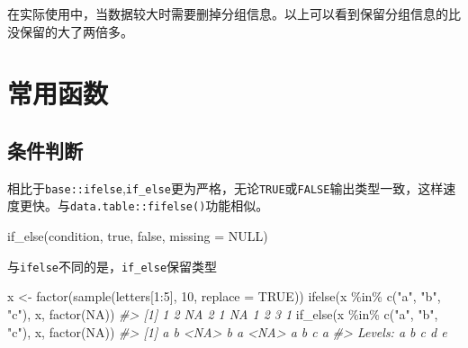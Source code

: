\documentclass[
]{book}
\newenvironment{Shaded}{\begin{snugshade}}{\end{snugshade}}
\newcommand{\AttributeTok}[1]{\textcolor[rgb]{0.77,0.63,0.00}{#1}}
\newcommand{\CommentTok}[1]{\textcolor[rgb]{0.56,0.35,0.01}{\textit{#1}}}
\newcommand{\ConstantTok}[1]{\textcolor[rgb]{0.00,0.00,0.00}{#1}}
\newcommand{\DecValTok}[1]{\textcolor[rgb]{0.00,0.00,0.81}{#1}}
\newcommand{\FunctionTok}[1]{\textcolor[rgb]{0.00,0.00,0.00}{#1}}
\newcommand{\NormalTok}[1]{#1}
\newcommand{\OtherTok}[1]{\textcolor[rgb]{0.56,0.35,0.01}{#1}}
\newcommand{\SpecialCharTok}[1]{\textcolor[rgb]{0.00,0.00,0.00}{#1}}
\newcommand{\StringTok}[1]{\textcolor[rgb]{0.31,0.60,0.02}{#1}}
\begin{document}
在实际使用中，当数据较大时需要删掉分组信息。以上可以看到保留分组信息的比没保留的大了两倍多。

\hypertarget{dplyr-functions}{%
\section{常用函数}\label{dplyr-functions}}

\hypertarget{ux6761ux4ef6ux5224ux65ad}{%
\subsection{条件判断}\label{ux6761ux4ef6ux5224ux65ad}}

相比于\texttt{base::ifelse},\texttt{if\_else}更为严格，无论\texttt{TRUE}或\texttt{FALSE}输出类型一致，这样速度更快。与\texttt{data.table::fifelse()}功能相似。

\begin{Shaded}
\begin{Highlighting}[]
\FunctionTok{if\_else}\NormalTok{(condition, true, false, }\AttributeTok{missing =} \ConstantTok{NULL}\NormalTok{)}
\end{Highlighting}
\end{Shaded}

与\texttt{ifelse}不同的是，\texttt{if\_else}保留类型

\begin{Shaded}
\begin{Highlighting}[]
\NormalTok{x }\OtherTok{\textless{}{-}} \FunctionTok{factor}\NormalTok{(}\FunctionTok{sample}\NormalTok{(letters[}\DecValTok{1}\SpecialCharTok{:}\DecValTok{5}\NormalTok{], }\DecValTok{10}\NormalTok{, }\AttributeTok{replace =} \ConstantTok{TRUE}\NormalTok{))}
\FunctionTok{ifelse}\NormalTok{(x }\SpecialCharTok{\%in\%} \FunctionTok{c}\NormalTok{(}\StringTok{"a"}\NormalTok{, }\StringTok{"b"}\NormalTok{, }\StringTok{"c"}\NormalTok{), x, }\FunctionTok{factor}\NormalTok{(}\ConstantTok{NA}\NormalTok{))}
\CommentTok{\#\textgreater{}  [1]  1  2 NA  2  1 NA  1  2  3  1}
\FunctionTok{if\_else}\NormalTok{(x }\SpecialCharTok{\%in\%} \FunctionTok{c}\NormalTok{(}\StringTok{"a"}\NormalTok{, }\StringTok{"b"}\NormalTok{, }\StringTok{"c"}\NormalTok{), x, }\FunctionTok{factor}\NormalTok{(}\ConstantTok{NA}\NormalTok{))}
\CommentTok{\#\textgreater{}  [1] a    b    \textless{}NA\textgreater{} b    a    \textless{}NA\textgreater{} a    b    c    a   }
\CommentTok{\#\textgreater{} Levels: a b c d e}
\end{Highlighting}
\end{Shaded}
\end{document}
